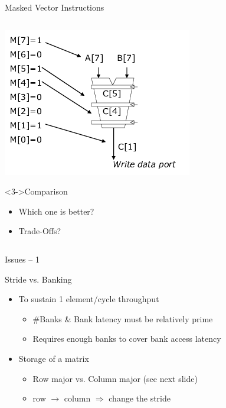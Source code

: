 \documentclass[presentation]{beamer}
\begin{document}
\begin{frame}[label={sec:orgd749335}]{Masked Vector Instructions}
\begin{columns}
\begin{column}[ignoreheading]{.49\columnwidth}
\begin{block}
\begin{itemize}
\end{itemize}
\begin{center}
\includegraphics[width=.9\linewidth]{./images/slides_SIMD_46_small2.png}
\end{center}
\end{block}

\begin{block}<3->{Comparison}
\begin{itemize}
\item Which one is better?
\item Trade-Offs?
\end{itemize}
\end{block}
\end{column}
\end{columns}
\end{frame}



\begin{frame}[label={sec:org7cd59d6}]{Issues -- 1}
\begin{block}{Stride vs. Banking}
\begin{itemize}
\item To sustain 1 element/cycle throughput
\begin{itemize}
\item \#Banks \& Bank latency must be \alert{relatively prime}
\item Requires \alert{enough banks} to cover bank access latency
\end{itemize}
\item Storage of a matrix
\begin{itemize}
\item Row major vs. Column major (see next slide)
\item row \(\rightarrow\) column \(\Rightarrow\) \alert{change the stride}
\end{itemize}
\end{itemize}
\end{block}
\end{frame}
\end{document}

